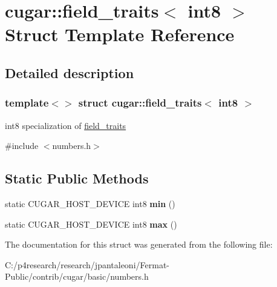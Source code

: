 \hypertarget{structcugar_1_1field__traits_3_01int8_01_4}{}\section{cugar\+:\+:field\+\_\+traits$<$ int8 $>$ Struct Template Reference}
\label{structcugar_1_1field__traits_3_01int8_01_4}


\subsection{Detailed description}
\subsubsection*{template$<$$>$\newline
struct cugar\+::field\+\_\+traits$<$ int8 $>$}

int8 specialization of \hyperlink{structcugar_1_1field__traits}{field\+\_\+traits} 

{\ttfamily \#include $<$numbers.\+h$>$}

\subsection*{Static Public Methods}
\begin{DoxyCompactItemize}
\item 
\mbox{\label{structcugar_1_1field__traits_3_01int8_01_4_a50b9c0d99e988881acc219a0675cfe16}} 
static C\+U\+G\+A\+R\+\_\+\+H\+O\+S\+T\+\_\+\+D\+E\+V\+I\+CE int8 {\bfseries min} ()
\item 
\mbox{\label{structcugar_1_1field__traits_3_01int8_01_4_a42a1451684bed4ed1aacefaba36c3916}} 
static C\+U\+G\+A\+R\+\_\+\+H\+O\+S\+T\+\_\+\+D\+E\+V\+I\+CE int8 {\bfseries max} ()
\end{DoxyCompactItemize}


The documentation for this struct was generated from the following file\+:\begin{DoxyCompactItemize}
\item 
C\+:/p4research/research/jpantaleoni/\+Fermat-\/\+Public/contrib/cugar/basic/numbers.\+h\end{DoxyCompactItemize}
